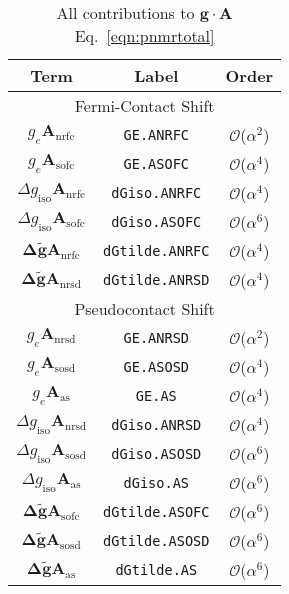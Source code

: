 \documentclass[11pt]{report}
\newcommand{\code}[1]{\lstinline!#1!}
\newcommand{\ten}{\bm}
\newcommand{\Order}{\ensuremath{\mathscr{O}}}  %
\newcommand\nrfc{\mathrm{nrfc}}
\newcommand\nrsd{\mathrm{nrsd}}
\newcommand\sofc{\mathrm{sofc}}
\newcommand\sosd{\mathrm{sosd}}
\newcommand\soas{\mathrm{as}}
\newcommand\iso{\mathrm{iso}}
\begin{document}
\begin{table}
\centering
\caption{All contributions to $\ten{g} \cdot \ten{A}$ Eq.~\ref{eqn:pnmrtotal}}
\label{table:totalcontrib}
\begin{tabular}{ccc}
\hline
Term & Label & Order \\ 
\hline
\multicolumn{3}{c}{Fermi-Contact Shift} \\
$g_e \ten{A}_\nrfc$ & \code{GE.ANRFC} & \Order($\alpha^2$) \\
$g_e \ten{A}_\sofc$ & \code{GE.ASOFC} & \Order($\alpha^4$) \\
$\Delta g_\iso \ten{A}_\nrfc$ & \code{dGiso.ANRFC} & \Order($\alpha^4$) \\
$\Delta g_\iso \ten{A}_\sofc$ & \code{dGiso.ASOFC} & \Order($\alpha^6$) \\
$\ten{\Delta \tilde{g}} \ten{A}_\nrfc$ & \code{dGtilde.ANRFC} & \Order($\alpha^4$) \\
$\ten{\Delta \tilde{g}} \ten{A}_\nrsd$ & \code{dGtilde.ANRSD} & \Order($\alpha^4$) \\[1.5ex]
\multicolumn{3}{c}{Pseudocontact Shift} \\
$g_e \ten{A}_\nrsd$ & \code{GE.ANRSD} & \Order($\alpha^2$) \\
$g_e \ten{A}_\sosd$ & \code{GE.ASOSD} & \Order($\alpha^4$) \\
$g_e \ten{A}_\soas$ & \code{GE.AS} & \Order($\alpha^4$) \\[1.5ex]
$\Delta g_\iso \ten{A}_\nrsd$ & \code{dGiso.ANRSD} & \Order($\alpha^4$) \\
$\Delta g_\iso \ten{A}_\sosd$ & \code{dGiso.ASOSD} & \Order($\alpha^6$) \\
$\Delta g_\iso \ten{A}_\soas$ & \code{dGiso.AS} & \Order($\alpha^6$) \\[1.5ex]
$\ten{\Delta \tilde{g}} \ten{A}_\sofc$ & \code{dGtilde.ASOFC} & \Order($\alpha^6$) \\
$\ten{\Delta \tilde{g}} \ten{A}_\sosd$ & \code{dGtilde.ASOSD} & \Order($\alpha^6$) \\
$\ten{\Delta \tilde{g}} \ten{A}_\soas$ & \code{dGtilde.AS} & \Order($\alpha^6$) \\[1.5ex]
\hline
\end{tabular}
\end{table}
\end{document}
